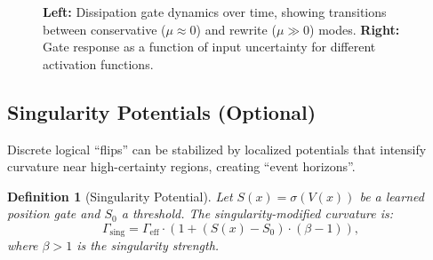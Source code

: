 \documentclass[12pt,letterpaper,twoside]{article}
\newtheorem{definition}{Definition}[section]
\begin{document}
\begin{figure}[htbp]
\centering
{}
\hfill
{}
\caption{\textbf{Left:} Dissipation gate dynamics over time, showing transitions between conservative ($\mu \approx 0$) and rewrite ($\mu \gg 0$) modes. \textbf{Right:} Gate response as a function of input uncertainty for different activation functions.}
\label{fig:dissipation-gates}
\end{figure}

\subsection{Singularity Potentials (Optional)}

Discrete logical ``flips'' can be stabilized by localized potentials that intensify curvature near high-certainty regions, creating ``event horizons''.

\begin{definition}[Singularity Potential]
Let $S(x) = \sigma(V(x))$ be a learned position gate and $S_0$ a threshold. The singularity-modified curvature is:
\[
\Gamma_{\text{sing}} = \Gamma_{\text{eff}} \cdot \left(1 + (S(x) - S_0) \cdot (\beta - 1)\right),
\]
where $\beta > 1$ is the singularity strength.
\end{definition}
\end{document}
